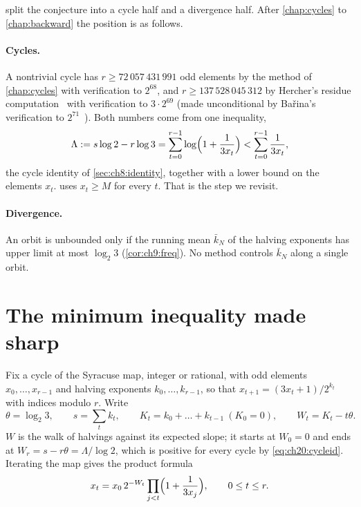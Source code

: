  split the conjecture into a cycle half and a divergence half. After \cref{chap:cycles} to \cref{chap:backward} the position is as follows.

\paragraph{Cycles.} A nontrivial cycle has $r\ge 72\,057\,431\,991$ odd elements by the method of \cref{chap:cycles} with verification to $2^{68}$, and $r\ge 137\,528\,045\,312$ by Hercher's residue computation~\cite{hercher2023} with verification to $3\cdot 2^{69}$ (made unconditional by Ba\v{r}ina's verification to $2^{71}$~\cite{barina2025}). Both numbers come from one inequality,
\begin{equation}\label{eq:ch20:cycleid}
\Lambda:=s\log 2-r\log 3=\sum_{t=0}^{r-1}\log\Bigl(1+\frac{1}{3x_t}\Bigr)<\sum_{t=0}^{r-1}\frac{1}{3x_t},
\end{equation}
the cycle identity of \cref{sec:ch8:identity}, together with a lower bound on the elements $x_t$.  uses $x_t\ge M$ for every $t$. That is the step we revisit.

\paragraph{Divergence.} An orbit is unbounded only if the running mean $\bar k_N$ of the halving exponents has upper limit at most $\log_2 3$ (\cref{cor:ch9:freq}). No method controls $\bar k_N$ along a single orbit.

\section{The minimum inequality made sharp}\label{sec:ch20:sharp}

Fix a cycle of the Syracuse map, integer or rational, with odd elements $x_0,\dots,x_{r-1}$ and halving exponents $k_0,\dots,k_{r-1}$, so that $x_{t+1}=(3x_t+1)/2^{k_t}$ with indices modulo $r$. Write
\[
\theta=\log_2 3,\qquad s=\sum_t k_t,\qquad K_t=k_0+\dots+k_{t-1}\ (K_0=0),\qquad W_t=K_t-t\theta .
\]
$W$ is the walk of halvings against its expected slope; it starts at $W_0=0$ and ends at $W_r=s-r\theta=\Lambda/\log 2$, which is positive for every cycle by \eqref{eq:ch20:cycleid}. Iterating the map gives the product formula
\begin{equation}\label{eq:ch20:product}
x_t=x_0\,2^{-W_t}\prod_{j<t}\Bigl(1+\frac{1}{3x_j}\Bigr),\qquad 0\le t\le r .
\end{equation}

